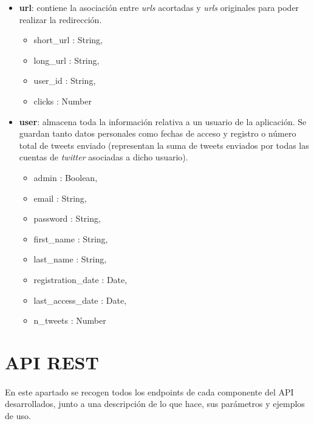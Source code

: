 \documentclass[a4paper]{article}
\begin{document}
\begin{itemize}
	\item \textbf{url}: contiene la asociación entre \textit{urls} acortadas y \textit{urls} originales para poder realizar la redirección.
	
		\begin{itemize}
		\item short\_url : String,
		\item long\_url : String,
		\item user\_id : String,
		\item clicks : Number
		\end{itemize}
	
	\item \textbf{user}: almacena toda la información relativa a un usuario de la aplicación. Se guardan tanto datos personales como fechas de acceso y registro o número total de tweets enviado (representan la suma de tweets enviados por todas las cuentas de \textit{twitter} asociadas a dicho usuario).
	
		\begin{itemize}
		\item admin : Boolean,
		\item email : String,
		\item password : String,
		\item first\_name : String,
		\item last\_name : String,
		\item registration\_date : Date,
		\item last\_access\_date : Date,
		\item n\_tweets : Number		
		\end{itemize}
	
	\end{itemize}

\newpage
\section{API REST}

	\paragraph{} En este apartado se recogen todos los endpoints de cada componente del API desarrollados, junto a una descripción de lo que hace, sus parámetros y ejemplos de uso.
	
\end{document}
